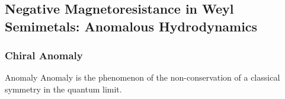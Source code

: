 \documentclass[10pt,aspectratio=43,xcolor=x11names,t]{beamer}%
\begin{document}
	\subsection{Negative Magnetoresistance in Weyl Semimetals: Anomalous Hydrodynamics}
		\begin{frame}\frametitle{Chiral Anomaly}
			\begin{block}{Anomaly}
				Anomaly is the phenomenon of the non-conservation of a classical symmetry in the quantum limit.
			\end{block}
\end{frame}
\end{document}
